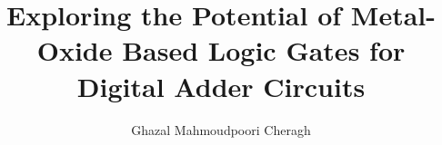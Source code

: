 \title{Exploring the Potential of Metal-Oxide Based Logic Gates for Digital Adder Circuits}
\author{Ghazal Mahmoudpoori Cheragh}



